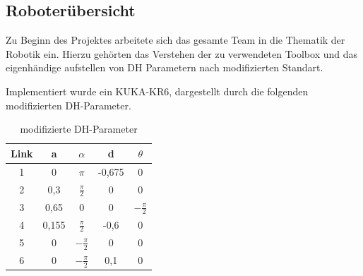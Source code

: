 \subsection{Roboterübersicht}\label{section:control_dh}
Zu Beginn des Projektes arbeitete sich das gesamte Team in die Thematik der Robotik ein. Hierzu gehörten das Verstehen der zu verwendeten Toolbox und das eigenhändige aufstellen von DH Parametern nach modifizierten Standart.

Implementiert wurde ein KUKA-KR6, dargestellt durch die folgenden modifizierten DH-Parameter.

\begin{table}[ht]
    \caption{modifizierte DH-Parameter}
    \label{tab:control_dh}
    \centering
        \begin{tabular}{|c|c|c|c|c|}
            \hline
            \textbf{Link} & \textbf{a} & \textbf{$\alpha$} & \textbf{d} & \textbf{$\theta$} \\\hline 
            1&0&$\pi$&-0,675&0\\ \hline
            2 & 0,3 & $\frac{\pi}{2}$ &0 & 0 \\ \hline
            3 & 0,65 & 0 & 0 &$-\frac{\pi}{2}$ \\ \hline
            4 & 0,155 & $\frac{\pi}{2}$ & -0,6 & 0 \\ \hline
            5 & 0 & $-\frac{\pi}{2}$ & 0 & 0 \\ \hline
            6 & 0 & $-\frac{\pi}{2}$ & 0,1 & 0 \\ \hline
        \end{tabular}
\end{table}


 
